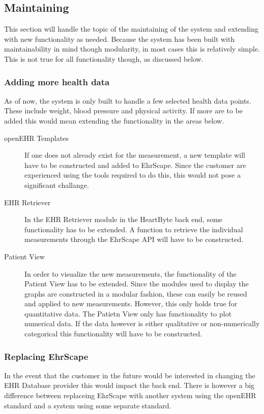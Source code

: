 \documentclass{article}
\begin{document}
\subsection{Maintaining}
This section will handle the topic of the maintaining of the system and extending with new functionality as needed. Because the system has been built with maintainability in mind though modularity, in most cases this is relatively simple. This is not true for all functionality though, as discussed below.

\subsubsection{Adding more health data}
As of now, the system is only built to handle a few selected health data points. These include weight, blood pressure and
physical activity. If more are to be added this would mean extending the functionality in the areas below.

\begin{description}
\item [openEHR Templates] If one does not already exist for the measurement, a new template will have to be constructed and added to EhrScape. Since the customer are experienced using the tools required to do this, this would not pose a significant challange.

\item [EHR Retriever] In the EHR Retriever module in the HeartByte back end, some functionality has to be extended. A function to retrieve the individual measurements through the EhrScape API will have to be constructed.

\item [Patient View] In order to visualize the new measurements, the functionality of the Patient View has to be extended. Since the modules used to display the graphs are constructed in a modular fashion, these can easily be reused and applied to new measurements. However, this only holds true for quantitative data. The Patietn View only has functionality to plot numerical data. If the data however is either qualitative or non-numerically categorical this functionality will have to be constructed.
\end{description}

\subsubsection{Replacing EhrScape}
In the event that the customer in the future would be interested in changing the EHR Database provider this would impact the back end. There is however a big difference between replaceing EhrScape with another system using the openEHR standard and a system using some separate standard.
\end{document}
